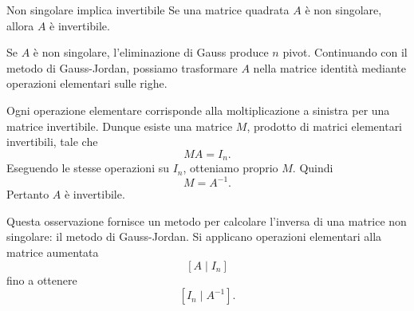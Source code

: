 \documentclass[a4paper]{article}
\begin{document}
\begin{snippettheorem}{Non singolare implica invertibile}
    Se una matrice quadrata \(A\) è non singolare, allora \(A\) è invertibile.
\end{snippettheorem}

\begin{snippetproof}{}
    Se \(A\) è non singolare, l'eliminazione di Gauss produce \(n\) pivot. Continuando con il metodo di Gauss-Jordan, possiamo trasformare \(A\) nella matrice identità mediante operazioni elementari sulle righe.

    Ogni operazione elementare corrisponde alla moltiplicazione a sinistra per una matrice invertibile. Dunque esiste una matrice \(M\), prodotto di matrici elementari invertibili, tale che
    \[
        MA=I_n.
    \]
    Eseguendo le stesse operazioni su \(I_n\), otteniamo proprio \(M\). Quindi
    \[
        M=A^{-1}.
    \]
    Pertanto \(A\) è invertibile.
\end{snippetproof}

Questa osservazione fornisce un metodo per calcolare l'inversa di una matrice non singolare: il metodo di Gauss-Jordan. Si applicano operazioni elementari alla matrice aumentata
\[
    \left[A\mid I_n\right]
\]
fino a ottenere
\[
    \left[I_n\mid A^{-1}\right].
\]
\end{document}
